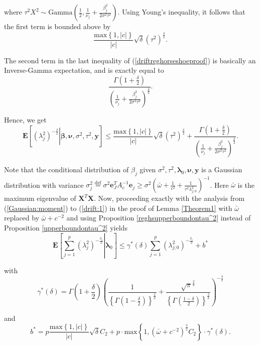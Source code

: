 \documentclass[noinfoline,11pt]{imsart}
\numberwithin{equation}{section}
\theoremstyle{plain}
\newcommand{\y}{\mathbf{y}}
\newcommand{\X}{\mathbf{X}}
\newcommand{\bb}{\boldsymbol{\beta}}
\newcommand{\bl}{\boldsymbol{\lambda}}
\newcommand{\E}{\boldsymbol{E}}
\begin{document}
\noindent
where $\tau^2X^2\sim\text{Gamma}\left(\frac{1}{2},\frac{1}{\nu_j}+\frac{\beta_j^2}{2\sigma^2\tau^2}\right)$. Using Young's inequality, it follows that the first term is bounded above by 
$$
\frac{\text{max}\left\{1,|c|\right\}}{|c|}\sqrt{\delta}\left(\tau^2\right)^{\frac{\delta}{2}}. 
$$

\noindent
The second term in the last inequality of (\ref{driftreghorseshoeproof}) is basically an Inverse-Gamma expectation, and is exactly equal to 
$$
\frac{\Gamma\left(1+\frac{\delta}{2}\right)}{\left(\frac{1}{\nu_j}+\frac{\beta_j^2}{2\sigma^2\tau^2}\right)^{\frac{\delta}{2}}}. 
$$

\noindent
Hence, we get 
$$
\E\left[\left.\left(\lambda_j^2\right)^{-\frac{\delta}{2}}\right|\boldsymbol{\bb,\nu},\sigma^2,\tau^2,\y\right] \leq \frac{\text{max}\left\{1,|c|\right\}}{|c|}\sqrt{\delta}\left(\tau^2\right)^{\frac{\delta}{2}} + \frac{\Gamma\left(1+\frac{\delta}{2}\right)}{\left(\frac{1}{\nu_j}+\frac{\beta_j^2}{2\sigma^2\tau^2}\right)^{\frac{\delta}{2}}}. 
$$

\noindent
Note that the conditional distribution of $\beta_j$ given $\sigma^2,\tau^2,\mathbf{\bl}_0,{\boldsymbol \nu},\mathbf{\y}$ is a Gaussian distribution with variance $\sigma_j^2\overset{\text{def}}{=}\sigma^2\boldsymbol{e}_J^TA_c^{-1}\boldsymbol{e}_j\geq \sigma^2\left(\bar{\omega}+\frac{1}{c^2} +\frac{1}{\tau^2\lambda_{j;0}^2}\right)^{-1}$. Here $\bar{\omega}$ is the maximum eigenvalue of $\X^T\X$. Now, proceeding exactly with the analysis 
from (\ref{Gaussian:moment}) to (\ref{drift:1}) in the proof of 
Lemma \ref{Theorem1} with $\bar{\omega}$ replaced by $\bar{\omega} + c^{-2}$ and using Proposition \ref{reghsupperboundontau^2} instead of 
Proposition \ref{upperboundontau^2} yields 
$$
\E\left[\left.\sum_{j=1}^p\left(\lambda_j^2\right)^{-\frac{\delta_1}{2}}\right|\mathbf{\bl}_0\right]\leq \gamma^* \left(\delta\right)\sum_{j=1}^p\left(\lambda_{j;0}^2\right)^{-\frac{\delta_1}{2}}+b^*
$$

\noindent
with 
$$
\gamma^*\left(\delta\right)=\Gamma\left(1+\frac{\delta}{2}\right)\left(\frac{1}{\left\{\Gamma\left(1-\frac{\delta}{2}\right)\right\}^{\frac{2}{\delta}}}+\frac{\sqrt{\pi}^{\frac{2}{\delta}}}{\left\{\Gamma\left(\frac{1-\delta}{2}\right)\right\}^{\frac{2}{\delta}}}\right)^{-\frac{\delta}{2}} 
$$

\noindent
and 
$$
b^*=p\frac{\text{max}\left\{1,|c|\right\}}{|c|}\sqrt{\delta}C_2+p\cdot\text{max}\left\{1,(\bar{\omega}+c^{-2})^{\frac{\delta}{2}}C_2\right\}\cdot\gamma^*\left(\delta\right). 
$$ 
\end{document}
